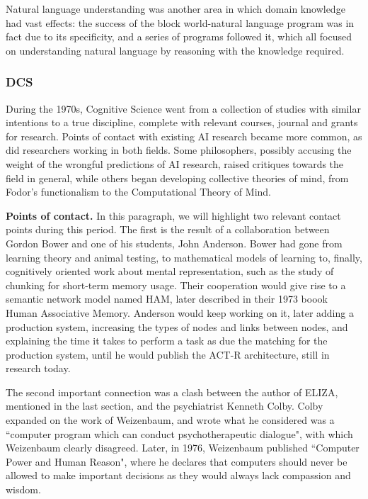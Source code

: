 \documentclass[../main.tex]{subfiles}
\begin{document}
Natural language understanding was another area in which domain knowledge had vast effects: the success of the block world-natural language program was in fact due to its specificity, and a series of programs followed it\cite{schankScriptsPlansGoals1977}\cite{wilenskyUnderstandingGoalbasedStories1978}\cite{schankComputerUnderstanding1981}, which all focused on understanding natural language by reasoning with the knowledge required.

\subsubsection{DCS}
During the 1970s, Cognitive Science went from a collection of studies with similar intentions to a true discipline, complete with relevant courses, journal and grants for research. Points of contact with existing AI research became more common, as did researchers working in both fields. Some philosophers, possibly accusing the weight of the wrongful predictions of AI research, raised critiques towards the field in general, while others began developing collective theories of mind, from Fodor's functionalism to the Computational Theory of Mind.

\vspace{4pt}
\textbf{Points of contact.}
In this paragraph, we will highlight two relevant contact points during this period. The first is the result of a collaboration between Gordon Bower and one of his students, John Anderson. Bower had gone from learning theory and animal testing, to mathematical models of learning to, finally, cognitively oriented work about mental representation, such as the study of chunking for short-term memory usage\cite{GordonBowerPsycNET}. Their cooperation would give rise to a semantic network model named HAM, later described in their 1973 boook Human Associative Memory\cite{andersonHumanAssociativeMemory1973}. Anderson would keep working on it, later adding a production system, increasing the types of nodes and links between nodes, and explaining the time it takes to perform a task as due the matching for the production system, until he would publish the ACT-R architecture, still in research today.

The second important connection was a clash between the author of ELIZA, mentioned in the last section, and the psychiatrist Kenneth Colby. Colby expanded on the work of Weizenbaum\cite{colbyComputerMethodPsychotherapy1966}, and wrote what he considered was a ``computer program which can conduct psychotherapeutic dialogue", with which Weizenbaum clearly disagreed. Later, in 1976, Weizenbaum published ``Computer Power and Human Reason"\cite{weizenbaumComputerPowerHuman1976}, where he declares that computers should never be allowed to make important decisions as they would always lack compassion and wisdom.
\end{document}

